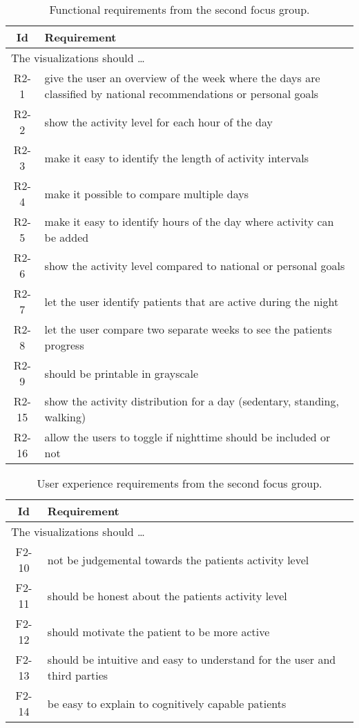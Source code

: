\begin{table}[h!]
  \begin{center}
  \begin{tabular}{|c|p{12cm}|}
    \hline
      \textbf{Id} & \textbf{Requirement} \\ \hline
    \multicolumn{2}{|l|}{The visualizations should \ldots} \\ \hline
      R2-1 & give the user an overview of the week where the days are classified by national recommendations or personal goals \\ \hline
      R2-2 & show the activity level for each hour of the day \\ \hline
      R2-3 & make it easy to identify the length of activity intervals \\ \hline
      R2-4 & make it possible to compare multiple days \\ \hline
      R2-5 & make it easy to identify hours of the day where activity can be added \\ \hline
      R2-6 & show the activity level compared to national or personal goals \\ \hline
      R2-7 & let the user identify patients that are active during the night \\ \hline
      R2-8 & let the user compare two separate weeks to see the patients progress \\ \hline
      R2-9 & should be printable in grayscale \\ \hline
      R2-15 & show the activity distribution for a day (sedentary, standing, walking) \\ \hline
      R2-16 & allow the users to toggle if nighttime should be included or not \\ \hline
  \end{tabular}
  \end{center}
  \caption{Functional requirements from the second focus group.}
  \label{tab:f2ReqCon}
\end{table}

\begin{table}[h!]
  \begin{center}
  \begin{tabular}{|c|p{12cm}|}
    \hline
      \textbf{Id} & \textbf{Requirement} \\ \hline
    \multicolumn{2}{|l|}{The visualizations should \ldots} \\ \hline
      F2-10 & not be judgemental towards the patients activity level \\ \hline
      F2-11 & should be honest about the patients activity level \\ \hline
      F2-12 & should motivate the patient to be more active \\ \hline
      F2-13 & should be intuitive and easy to understand for the user and third parties \\ \hline
      F2-14 & be easy to explain to cognitively capable patients \\ \hline
  \end{tabular}
  \end{center}
  \caption{User experience requirements from the second focus group.}
  \label{tab:f2ReqUxCon}
\end{table}

